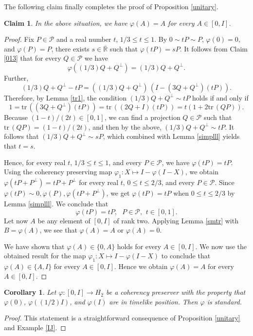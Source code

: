 \documentclass[10pt,a4paper]{amsart}
\newcommand\oH{{\overline{H_2}}}
\newcommand\oR{{\overline{\mathbb{R}}}}
\newtheorem{corollary}[theorem]{Corollary}
\newtheorem{claim}[theorem]{Claim}
\theoremstyle{definition}
\theoremstyle{remark}
\numberwithin{subsection}{section}
\numberwithin{equation}{section}
\begin{document}
The following claim finally completes the proof of Proposition \ref{unitary}.

\begin{claim}
In the above situation, we have $\varphi (A) = A$ for every $A\in [0, I]$.
\end{claim}
\begin{proof}
Fix $P \in \mathcal{P}$ and a real number $t$, $1/3 \le t \le 1$. 
By $0\sim tP\sim P$, $\varphi(0)=0$, and $\varphi(P)=P$, there exists $s \in {\oR}$ such that $\varphi (tP) = sP$. 
It follows from Claim \ref{013} that for every $Q \in \mathcal{P}$ we have 
\[
\varphi ( (1/3)Q + Q^\perp) = (1/3)Q + Q^\perp.
\]
Further,
\[
(1/3)Q + Q^\perp -tP = ((1/3)Q + Q^\perp)\, (I - (3Q + Q^\perp) (tP)).
\]
Therefore, by Lemma \ref{tr1}, the condition $(1/3)Q + Q^\perp  \sim tP$ holds if and only if 
\[
1 = \mathrm{tr}\,( (3Q + Q^\perp) (tP)) = \mathrm{tr}\, ( (2Q + I)(tP)) = t (1 + 2 \mathrm{tr}\, (QP)).
\]
Because $(1-t) / (2t) \in [0,1]$, we can find a projection $Q \in \mathcal{P}$ such that  $\mathrm{tr}\, (QP) = (1-t) / (2t)$, and then by the above, 
 $(1/3)Q + Q^\perp  \sim tP$. It follows that  $(1/3)Q + Q^\perp  \sim sP$, which combined with Lemma \ref{simplll} yields that $t=s$.

Hence, for every real $t$, $1/3 \le t \le 1$, and every $P \in \mathcal{P}$, we have $\varphi (tP) = t P$. 
Using the coherency preserving map $\varphi_1 \colon X\mapsto I - \varphi (I -X)$, we obtain $\varphi (tP+P^\perp) = t P+P^\perp$ for every real $t$, $0\le t \le 2/3$, and every $P \in \mathcal{P}$. 
Since $\varphi(tP)\sim 0, \varphi(P), \varphi (tP+P^\perp)$, we get $\varphi(tP)=tP$ when $0\le t \le 2/3$ by Lemma \ref{simplll}. 
We conclude that
\[
\varphi (tP) = tP, \ \ \ P \in \mathcal{P}, \ \, t \in [0,1].
\]
Let now $A$ be any element of $[0,I]$ of rank two. Applying Lemma \ref{smtr} with $B = \varphi (A)$, we see that $\varphi (A) = A$ or $\varphi (A) = 0$. 

We have shown that $\varphi (A) \in \{0, A\}$ holds for every $A \in [0,I]$.
We now use the obtained result for the map $\varphi_1\colon X \mapsto I - \varphi ( I -X)$ to conclude that  $\varphi (A) \in \{A, I\}$ for every $A \in [0,I]$. Hence we obtain $\varphi (A) = A$ for every $A \in [0,I]$. 
\end{proof}

\begin{corollary}\label{pqyl}
Let $\varphi : [0,I] \to \oH$ be a coherency preserver with the property that $\varphi (0)$, $\varphi((1/2)I)$, and $\varphi (I)$ are in timelike position. Then $\varphi$ is standard.
\end{corollary}
\begin{proof}
This statement is a straightforward consequence of Proposition \ref{unitary} and Example \ref{IJ}.
\end{proof} 
\end{document}
